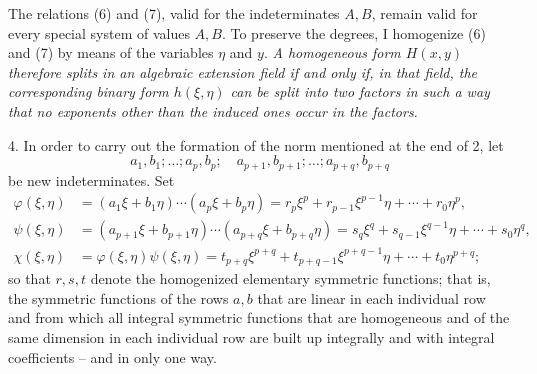 \documentclass[11pt]{article}
\begin{document}
The relations (6) and (7), valid for the indeterminates $A,B$, remain valid for every special system of values $A,B$. To preserve the degrees, I homogenize (6) and (7) by means of the variables $\eta$ and $y$. \emph{A homogeneous form $H(x,y)$ therefore splits in an algebraic extension field if and only if, in that field, the corresponding binary form $h(\xi,\eta)$ can be split into two factors in such a way that no exponents other than the induced ones occur in the factors.}

4. In order to carry out the formation of the norm mentioned at the end of 2, let
\[
 a_1,b_1;\ldots; a_p,b_p;\quad a_{p+1},b_{p+1};\ldots; a_{p+q},b_{p+q}
\]
be new indeterminates. Set
\begin{equation}
\begin{aligned}
 \varphi(\xi,\eta)&=(a_1\xi+b_1\eta)\cdots(a_p\xi+b_p\eta)
     =r_p\xi^p+r_{p-1}\xi^{p-1}\eta+\cdots+r_0\eta^p,\\
 \psi(\xi,\eta)&=(a_{p+1}\xi+b_{p+1}\eta)\cdots(a_{p+q}\xi+b_{p+q}\eta)
     =s_q\xi^q+s_{q-1}\xi^{q-1}\eta+\cdots+s_0\eta^q,\\
 \chi(\xi,\eta)&=\varphi(\xi,\eta)\psi(\xi,\eta)
     =t_{p+q}\xi^{p+q}+t_{p+q-1}\xi^{p+q-1}\eta+\cdots+t_0\eta^{p+q};
\end{aligned}
\tag{8}
\end{equation}
so that $r,s,t$ denote the homogenized elementary symmetric functions; that is, the symmetric functions of the rows $a,b$ that are linear in each individual row and from which all integral symmetric functions that are homogeneous and of the same dimension in each individual row are built up integrally and with integral coefficients -- and in only one way.
\end{document}
